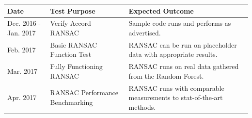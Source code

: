 \documentclass[12pt]{article}
\begin{document}
\begin{longtable}[]{@{}lll@{}}
\toprule
\begin{minipage}[b]{0.06\columnwidth}\raggedright\strut
Date\strut
\end{minipage} & \begin{minipage}[b]{0.16\columnwidth}\raggedright\strut
Test Purpose\strut
\end{minipage} & \begin{minipage}[b]{0.22\columnwidth}\raggedright\strut
Expected Outcome\strut
\end{minipage}\tabularnewline
\midrule
\endhead
\begin{minipage}[t]{0.06\columnwidth}\raggedright\strut
Dec. 2016 - Jan. 2017\strut
\end{minipage} & \begin{minipage}[t]{0.16\columnwidth}\raggedright\strut
Verify Accord RANSAC\strut
\end{minipage} & \begin{minipage}[t]{0.22\columnwidth}\raggedright\strut
Sample code runs and performs as advertised.\strut
\end{minipage}\tabularnewline
\begin{minipage}[t]{0.06\columnwidth}\raggedright\strut
Feb. 2017\strut
\end{minipage} & \begin{minipage}[t]{0.16\columnwidth}\raggedright\strut
Basic RANSAC Function Test\strut
\end{minipage} & \begin{minipage}[t]{0.22\columnwidth}\raggedright\strut
RANSAC can be run on placeholder data with appropriate results.\strut
\end{minipage}\tabularnewline
\begin{minipage}[t]{0.06\columnwidth}\raggedright\strut
Mar. 2017\strut
\end{minipage} & \begin{minipage}[t]{0.16\columnwidth}\raggedright\strut
Fully Functioning RANSAC\strut
\end{minipage} & \begin{minipage}[t]{0.22\columnwidth}\raggedright\strut
RANSAC runs on real data gathered from the Random Forest.\strut
\end{minipage}\tabularnewline
\begin{minipage}[t]{0.06\columnwidth}\raggedright\strut
Apr. 2017\strut
\end{minipage} & \begin{minipage}[t]{0.16\columnwidth}\raggedright\strut
RANSAC Performance Benchmarking\strut
\end{minipage} & \begin{minipage}[t]{0.22\columnwidth}\raggedright\strut
RANSAC runs with comparable measurements to stat-of-the-art
methods.\strut
\end{minipage}\tabularnewline
\bottomrule
\end{longtable}
\end{document}
